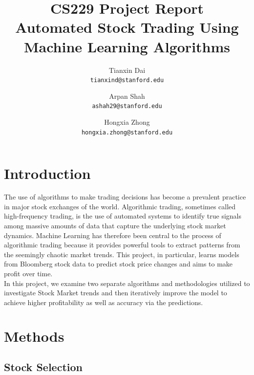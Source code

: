 \documentclass[10pt,twocolumn,letterpaper]{article}
\begin{document}
\title{CS229 Project Report \\
Automated Stock Trading Using Machine Learning Algorithms}

\author{Tianxin Dai\\
{\tt\small tianxind@stanford.edu}
\and
Arpan Shah\\
{\tt\small ashah29@stanford.edu}
\and
Hongxia Zhong\\
{\tt\small hongxia.zhong@stanford.edu}
}

\maketitle
\thispagestyle{empty}

\section{Introduction}
The use of algorithms to make trading decisions has become a prevalent practice in major stock exchanges of the world. Algorithmic trading, sometimes called high-frequency trading, is
the use of automated systems to identify true signals among massive amounts of data that capture the underlying stock market dynamics. Machine Learning has therefore been central to the process of algorithmic trading because it provides powerful tools to extract patterns from the seemingly chaotic market trends. This project, in particular, learns models from Bloomberg stock data to predict stock price changes and aims to make profit over time.\\

In this project, we examine two separate algorithms and methodologies utilized to investigate Stock Market trends and then iteratively improve the model to achieve higher profitability as well as accuracy via the predictions. 

\section{Methods}
\subsection{Stock Selection}
\end{document}
